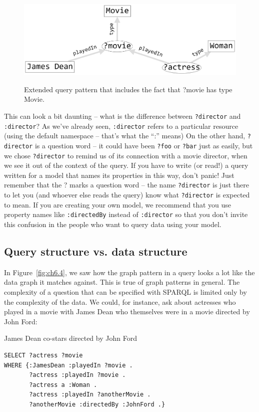 \begin{figure}
\centering
\includegraphics[width=5in]{SWWOv3/media/ch6/figure6-5.png}
\label{fig:ch6.5}
\caption{Extended query pattern that includes the fact that ?movie has type Movie.
}
\end{figure}

This can look a bit daunting -- what is the difference between \texttt{?director}
and \texttt{:director}? As we've already seen, \texttt{:director} refers to a particular
resource (using the default namespace -- that's what the ``:'' means) On
the other hand, \texttt{?director} is a question word -- it could have been \texttt{?foo}
or \texttt{?bar} just as easily, but we chose \texttt{?director} to remind us of its
connection with a movie director, when we see it out of the context of
the query. If you have to write (or read!) a query written for a model
that names its properties in this way, don't panic! Just remember that
the ? marks a question word -- the name \texttt{?director} is just there to let
you (and whoever else reads the query) know what \texttt{?director} is expected
to mean. If you are creating your own model, we recommend that you use
property names like \texttt{:directedBy} instead of \texttt{:director} so that you don't
invite this confusion in the people who want to query data using your
model.

\subsection{Query structure vs. data structure}

In Figure~\ref{fig:ch6.4}, we saw how the graph pattern in a query looks a lot like
the data graph it matches against. This is true of graph patterns in
general. The complexity of a question that can be specified with SPARQL
is limited only by the complexity of the data. We could, for instance,
ask about actresses who played in a movie with James Dean who themselves
were in a movie directed by John Ford:

\begin{query}James Dean co-stars directed by John Ford\end{query}
\begin{lstlisting}
SELECT ?actress ?movie
WHERE {:JamesDean :playedIn ?movie .
       ?actress :playedIn ?movie .
       ?actress a :Woman .
       ?actress :playedIn ?anotherMovie .
       ?anotherMovie :directedBy :JohnFord .}
\end{lstlisting}

